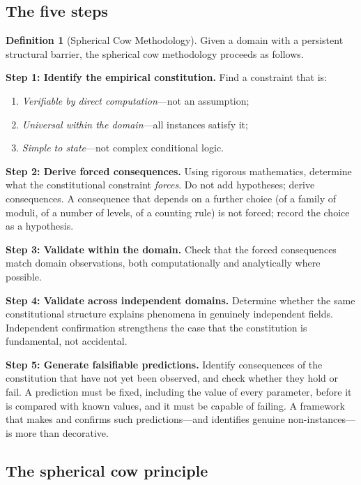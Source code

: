 \documentclass[12pt]{amsart}
\theoremstyle{plain}
\theoremstyle{definition}
\newtheorem{definition}[theorem]{Definition}
\theoremstyle{remark}
\begin{document}
\subsection{The five steps}
\label{sec:fivesteps}

\begin{definition}[Spherical Cow Methodology]
\label{def:methodology}
Given a domain with a persistent structural barrier, the spherical cow
methodology proceeds as follows.

\smallskip
\noindent\textbf{Step 1: Identify the empirical constitution.}
Find a constraint that is:
\begin{enumerate}[label=(\alph*)]
  \item \emph{Verifiable by direct computation}---not an assumption;
  \item \emph{Universal within the domain}---all instances satisfy it;
  \item \emph{Simple to state}---not complex conditional logic.
\end{enumerate}

\noindent\textbf{Step 2: Derive forced consequences.}
Using rigorous mathematics, determine what the constitutional constraint
\emph{forces}. Do not add hypotheses; derive consequences. A consequence that
depends on a further choice (of a family of moduli, of a number of levels, of a
counting rule) is not forced; record the choice as a hypothesis.

\noindent\textbf{Step 3: Validate within the domain.}
Check that the forced consequences match domain observations, both
computationally and analytically where possible.

\noindent\textbf{Step 4: Validate across independent domains.}
Determine whether the same constitutional structure explains phenomena in
genuinely independent fields. Independent confirmation strengthens the case
that the constitution is fundamental, not accidental.

\noindent\textbf{Step 5: Generate falsifiable predictions.}
Identify consequences of the constitution that have not yet been observed,
and check whether they hold or fail. A prediction must be fixed, including the
value of every parameter, before it is compared with known values, and it must
be capable of failing. A framework that makes and confirms such
predictions---and identifies genuine non-instances---is more than decorative.
\end{definition}

\subsection{The spherical cow principle}
\label{sec:principle}
\end{document}
